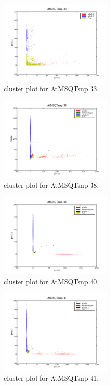 \begin{figure}[H]
\includegraphics[width=0.5\textwidth]{figures/cluster_plot_AtMSQTsnp_33.png}
\caption{cluster plot for AtMSQTsnp 33.} \label{flAtMSQTsnp33}
\end{figure}
\begin{figure}[H]
\includegraphics[width=0.5\textwidth]{figures/cluster_plot_AtMSQTsnp_38.png}
\caption{cluster plot for AtMSQTsnp 38.} \label{flAtMSQTsnp38}
\end{figure}
\begin{figure}[H]
\includegraphics[width=0.5\textwidth]{figures/cluster_plot_AtMSQTsnp_40.png}
\caption{cluster plot for AtMSQTsnp 40.} \label{flAtMSQTsnp40}
\end{figure}
\begin{figure}[H]
\includegraphics[width=0.5\textwidth]{figures/cluster_plot_AtMSQTsnp_41.png}
\caption{cluster plot for AtMSQTsnp 41.} \label{flAtMSQTsnp41}
\end{figure}

